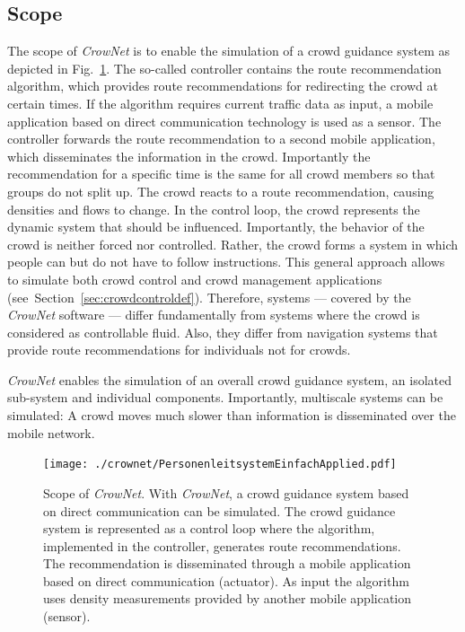\subsection{Scope}

The scope of \textit{CrowNet} is to enable the simulation of a crowd guidance system as depicted in Fig.~\ref{fig:regelkreisapplied}. The so-called controller contains the route recommendation algorithm, which provides route recommendations for redirecting the crowd at certain times. If the algorithm requires current traffic data as input, a mobile application based on direct communication technology is used as a sensor. The controller forwards the route recommendation to a second mobile application, which disseminates the information in the crowd. Importantly the recommendation for a specific time is the same for all crowd members so that groups do not split up.
The crowd reacts to a route recommendation, causing densities and flows to change. 
In the control loop, the crowd represents the dynamic system that should be influenced. Importantly, the behavior of the crowd is neither forced nor controlled. Rather, the crowd forms a system in which people can but do not have to follow instructions. This general approach allows to simulate both crowd control and crowd management applications (see~Section~\ref{sec:crowdcontroldef}). Therefore, systems --- covered by the \textit{CrowNet} software --- differ fundamentally from systems where the crowd is considered as controllable fluid. Also, they differ from navigation systems that provide route recommendations for individuals not for crowds.

\textit{CrowNet} enables the simulation of an overall crowd guidance system, an isolated sub-system and individual components. Importantly,  multiscale systems can be simulated: A crowd moves much slower than information is disseminated over the mobile network.



\begin{figure}[hbt!]
\texttt{[image: ./crownet/PersonenleitsystemEinfachApplied.pdf]} 
\caption[Pedestrian guidance system based on direct communication]{ Scope of \textit{CrowNet}. With \textit{CrowNet}, a crowd guidance system based on direct communication can be simulated. The crowd guidance system is represented as a control loop where the algorithm, implemented in the controller, generates route recommendations. The recommendation is disseminated through a mobile application based on direct communication (actuator). As input the algorithm uses density measurements provided by another mobile application (sensor). }
\label{fig:regelkreisapplied}
\end{figure}



